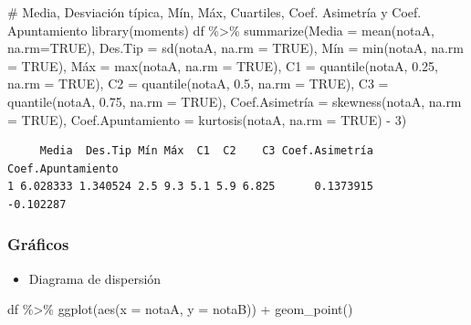 \documentclass[
  a4paper,
]{scrreport}
\newenvironment{Shaded}{\begin{snugshade}}{\end{snugshade}}
\newcommand{\AttributeTok}[1]{\textcolor[rgb]{0.40,0.45,0.13}{#1}}
\newcommand{\CommentTok}[1]{\textcolor[rgb]{0.37,0.37,0.37}{#1}}
\newcommand{\ConstantTok}[1]{\textcolor[rgb]{0.56,0.35,0.01}{#1}}
\newcommand{\DecValTok}[1]{\textcolor[rgb]{0.68,0.00,0.00}{#1}}
\newcommand{\FloatTok}[1]{\textcolor[rgb]{0.68,0.00,0.00}{#1}}
\newcommand{\FunctionTok}[1]{\textcolor[rgb]{0.28,0.35,0.67}{#1}}
\newcommand{\NormalTok}[1]{\textcolor[rgb]{0.00,0.23,0.31}{#1}}
\newcommand{\OtherTok}[1]{\textcolor[rgb]{0.00,0.23,0.31}{#1}}
\newcommand{\SpecialCharTok}[1]{\textcolor[rgb]{0.37,0.37,0.37}{#1}}
\providecommand{\tightlist}{%
  \setlength{\itemsep}{0pt}\setlength{\parskip}{0pt}}\usepackage{longtable,booktabs,array}
\theoremstyle{definition}
\theoremstyle{definition}
\theoremstyle{remark}
\begin{document}
\begin{Shaded}
\begin{Highlighting}[]
\CommentTok{\# Media, Desviación típica, Mín, Máx, Cuartiles, Coef. Asimetría y Coef. Apuntamiento}
\FunctionTok{library}\NormalTok{(moments)}
\NormalTok{df }\SpecialCharTok{\%\textgreater{}\%} \FunctionTok{summarize}\NormalTok{(}\AttributeTok{Media =} \FunctionTok{mean}\NormalTok{(notaA, }\AttributeTok{na.rm=}\ConstantTok{TRUE}\NormalTok{), }\AttributeTok{Des.Tip =} \FunctionTok{sd}\NormalTok{(notaA, }\AttributeTok{na.rm =} \ConstantTok{TRUE}\NormalTok{), Mín }\OtherTok{=} \FunctionTok{min}\NormalTok{(notaA, }\AttributeTok{na.rm =} \ConstantTok{TRUE}\NormalTok{), Máx }\OtherTok{=} \FunctionTok{max}\NormalTok{(notaA, }\AttributeTok{na.rm =} \ConstantTok{TRUE}\NormalTok{), }\AttributeTok{C1 =} \FunctionTok{quantile}\NormalTok{(notaA, }\FloatTok{0.25}\NormalTok{, }\AttributeTok{na.rm =} \ConstantTok{TRUE}\NormalTok{), }\AttributeTok{C2 =} \FunctionTok{quantile}\NormalTok{(notaA, }\FloatTok{0.5}\NormalTok{, }\AttributeTok{na.rm =} \ConstantTok{TRUE}\NormalTok{), }\AttributeTok{C3 =} \FunctionTok{quantile}\NormalTok{(notaA, }\FloatTok{0.75}\NormalTok{, }\AttributeTok{na.rm =} \ConstantTok{TRUE}\NormalTok{), Coef.Asimetría }\OtherTok{=} \FunctionTok{skewness}\NormalTok{(notaA, }\AttributeTok{na.rm =} \ConstantTok{TRUE}\NormalTok{), }\AttributeTok{Coef.Apuntamiento =} \FunctionTok{kurtosis}\NormalTok{(notaA, }\AttributeTok{na.rm =} \ConstantTok{TRUE}\NormalTok{) }\SpecialCharTok{{-}} \DecValTok{3}\NormalTok{)}
\end{Highlighting}
\end{Shaded}

\begin{verbatim}
     Media  Des.Tip Mín Máx  C1  C2    C3 Coef.Asimetría Coef.Apuntamiento
1 6.028333 1.340524 2.5 9.3 5.1 5.9 6.825      0.1373915         -0.102287
\end{verbatim}

\hypertarget{gruxe1ficos-5}{%
\subsubsection{Gráficos}\label{gruxe1ficos-5}}

\begin{itemize}
\tightlist
\item
  Diagrama de dispersión
\end{itemize}

\begin{Shaded}
\begin{Highlighting}[]
\NormalTok{df }\SpecialCharTok{\%\textgreater{}\%} \FunctionTok{ggplot}\NormalTok{(}\FunctionTok{aes}\NormalTok{(}\AttributeTok{x =}\NormalTok{ notaA, }\AttributeTok{y =}\NormalTok{ notaB)) }\SpecialCharTok{+} 
  \FunctionTok{geom\_point}\NormalTok{()}
\end{Highlighting}
\end{Shaded}
\end{document}

